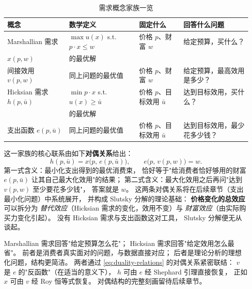 \begin{table}[H]
\centering
\small
\begin{tabular}{@{}llll@{}}
\toprule
\textbf{概念} & \textbf{数学定义} & \textbf{固定什么} & \textbf{回答什么问题} \\
\midrule
Marshallian 需求 & $\max u(x)$ s.t.\ $p\cdot x\le w$ & 价格 $p$、财富 $w$ & 给定预算，买什么？ \\
$x(p,w)$ & 的最优解 & & \\
\addlinespace[3pt]
间接效用 $v(p,w)$ & 同上问题的最优值 & 价格 $p$、财富 $w$ & 给定预算，最高效用是多少？ \\
\addlinespace[3pt]
Hicksian 需求 $h(p,\bar u)$ & \multicolumn{1}{l}{$\min p\cdot x$ s.t.\ $u(x)\ge\bar u$} & 价格 $p$、目标效用 $\bar u$ & 达到目标效用，买什么？ \\
 & 的最优解 & & \\
\addlinespace[3pt]
支出函数 $e(p,\bar u)$ & 同上问题的最优值 & 价格 $p$、目标效用 $\bar u$ & 达到目标效用，最少花多少钱？ \\
\bottomrule
\end{tabular}
\caption{需求概念家族一览}
\label{tab:demand-family}
\end{table}

这一家族的核心联系由如下\textbf{对偶关系}给出：
\begin{equation}\label{eq:duality-relations}
  h(p,\bar u) = x\bigl(p,\,e(p,\bar u)\bigr),
  \qquad
  e\bigl(p,\,v(p,w)\bigr) = w.
\end{equation}
第一式含义：最小化支出得到的最优消费束，
恰好等于"给消费者恰好够用的财富 $e(p,\bar u)$ 让其自己最大化效用"的结果；
第二式含义：最大化效用之后再问"达到 $v(p,w)$ 至少要花多少钱"，
答案就是 $w$。
这两条对偶关系将在后续章节（支出最小化问题）中系统展开，
并构成 Slutsky 分解的理论基础：
\textbf{价格变化的总效应}可以拆分为
\emph{替代效应}（Hicksian 需求的变化，效用不变）与
\emph{财富效应}（由实际购买力变化引起）。
没有 Hicksian 需求与支出函数这对工具，
Slutsky 分解便无从谈起。

\begin{remark}[为什么需要两套概念？]
Marshallian 需求回答"给定预算怎么花"；
Hicksian 需求回答"给定效用怎么最省"。
前者是消费者真实面对的问题，与数据直接对应；
后者是理论分析的理想化问题，结构更简洁。
两者通过 \eqref{eq:duality-relations} 的对偶关系紧密联结：
$v$ 是 $e$ 的"反函数"（在适当的意义下），
$h$ 可由 $e$ 经 Shephard 引理直接恢复，
正如 $x$ 可由 $v$ 经 Roy 恒等式恢复。
对偶结构的完整刻画留待后续章节。
\end{remark}
\label{sec:sup-max}

